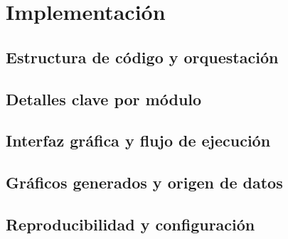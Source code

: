 \section{Implementación}\label{sec:implementacion}

\subsection{Estructura de código y orquestación}\label{subsec:impl-codigo}

\subsection{Detalles clave por módulo}\label{subsec:impl-modulos}

\subsection{Interfaz gráfica y flujo de ejecución}\label{subsec:impl-ui}

\subsection{Gráficos generados y origen de datos}\label{subsec:impl-graficos}

\subsection{Reproducibilidad y configuración}\label{subsec:impl-reprod}
